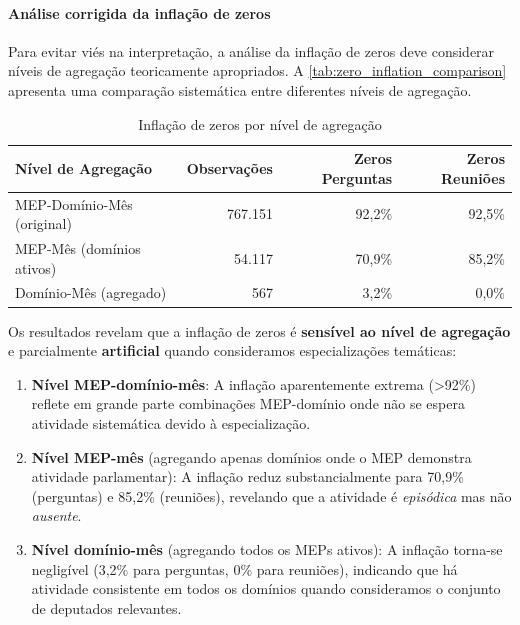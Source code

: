 \paragraph{Análise corrigida da inflação de zeros}

Para evitar viés na interpretação, a análise da inflação de zeros deve considerar níveis de agregação teoricamente apropriados. A \autoref{tab:zero_inflation_comparison} apresenta uma comparação sistemática entre diferentes níveis de agregação.

\begin{table}[htbp]
\centering
\caption{Inflação de zeros por nível de agregação}
\label{tab:zero_inflation_comparison}
\begin{tabularx}{\textwidth}{>{\raggedright\arraybackslash}X r r r}
\toprule
\textbf{Nível de Agregação} & \textbf{Observações} & \textbf{Zeros Perguntas} & \textbf{Zeros Reuniões} \\
\midrule
MEP-Domínio-Mês (original) & 767{.}151 & 92{,}2\% & 92{,}5\% \\
MEP-Mês (domínios ativos) & 54{.}117 & 70{,}9\% & 85{,}2\% \\
Domínio-Mês (agregado) & 567 & 3{,}2\% & 0{,}0\% \\
\bottomrule
\end{tabularx}
\end{table}

Os resultados revelam que a inflação de zeros é \textbf{sensível ao nível de agregação} e parcialmente \textbf{artificial} quando consideramos especializações temáticas:

\begin{enumerate}
    \item \textbf{Nível MEP-domínio-mês}: A inflação aparentemente extrema (>92\%) reflete em grande parte combinações MEP-domínio onde não se espera atividade sistemática devido à especialização.
    
    \item \textbf{Nível MEP-mês} (agregando apenas domínios onde o MEP demonstra atividade parlamentar): A inflação reduz substancialmente para 70,9\% (perguntas) e 85,2\% (reuniões), revelando que a atividade é \textit{episódica} mas não \textit{ausente}.
    
    \item \textbf{Nível domínio-mês} (agregando todos os MEPs ativos): A inflação torna-se negligível (3,2\% para perguntas, 0\% para reuniões), indicando que há atividade consistente em todos os domínios quando consideramos o conjunto de deputados relevantes.
\end{enumerate}

